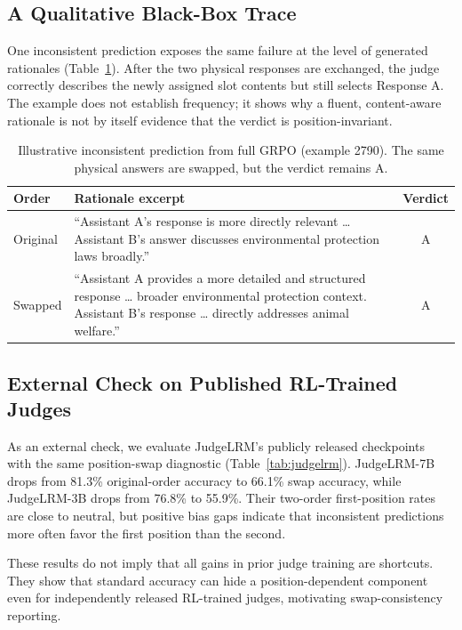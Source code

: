 \documentclass[11pt]{article}
\begin{document}
\subsection{A Qualitative Black-Box Trace}

One inconsistent prediction exposes the same failure at the level of generated rationales (Table~\ref{tab:case}). After the two physical responses are exchanged, the judge correctly describes the newly assigned slot contents but still selects Response A. The example does not establish frequency; it shows why a fluent, content-aware rationale is not by itself evidence that the verdict is position-invariant.

\begin{table}[H]
\centering
\scriptsize
\setlength{\tabcolsep}{2.5pt}
\begin{tabular}{p{}p{}c}
\toprule
\textbf{Order} & \textbf{Rationale excerpt} & \textbf{Verdict} \\
\midrule
Original & ``Assistant A's response is more directly relevant \ldots{} Assistant B's answer discusses environmental protection laws broadly.'' & A \\
Swapped & ``Assistant A provides a more detailed and structured response \ldots{} broader environmental protection context. Assistant B's response \ldots{} directly addresses animal welfare.'' & A \\
\bottomrule
\end{tabular}
\caption{Illustrative inconsistent prediction from full GRPO (example 2790). The same physical answers are swapped, but the verdict remains A.}
\label{tab:case}
\end{table}

\subsection{External Check on Published RL-Trained Judges}

As an external check, we evaluate JudgeLRM's publicly released checkpoints~\citep{chen2025judgelrm} with the same position-swap diagnostic (Table~\ref{tab:judgelrm}). JudgeLRM-7B drops from 81.3\% original-order accuracy to 66.1\% swap accuracy, while JudgeLRM-3B drops from 76.8\% to 55.9\%. Their two-order first-position rates are close to neutral, but positive bias gaps indicate that inconsistent predictions more often favor the first position than the second.

These results do not imply that all gains in prior judge training are shortcuts. They show that standard accuracy can hide a position-dependent component even for independently released RL-trained judges, motivating swap-consistency reporting.
\end{document}
